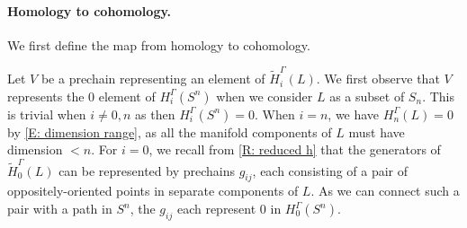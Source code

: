 \documentclass[12pt]{article}
\theoremstyle{plain}
\theoremstyle{definition}
\theoremstyle{remark}
\newcommand{\td}[1]{\tilde{#1}}
\newcommand{\into}{\hookrightarrow}
\newcommand{\Z}{\mathbb{Z}}
\newcommand{\mc}[1]{\mathcal{#1}}
\begin{document}
\begin{comment}
First, let $\mc K_i = \ker(H_i^\Gamma(L) \to H_i^\Gamma(S^n)$, where the map is induced by the inclusion $L \into S^n$.
In all degrees $i>0$, this will simply be $H_i(\Gamma(L))$.
For $0<i<n$, this follows immediately from the computation of the homology of spheres REF.
In dimension $n$, we observe that $H_n^\Gamma(L) = 0$ by \cref{E: dimension range}, as all the manifold components of $L$ must have dimension $<n$.
In degree $0$, if $L$ has $\ell$ components, we have the obvious surjection $H_0^\Gamma(L) \cong \Z^\ell
\to H_0^\Gamma(S^n) \cong \Z$, so the kernel $\mc K_0$ is isomorphic to $\Z^{\ell-1}$.
Generators of $\mc K_0$ can be represented by prechains consisting of pairs of points in separate components of $L$ with opposite orientations, as if they were in the same component then they would represent $0$ in $H_0^\Gamma(L)$.
If $g_{ij}$ is a homology class represented by a prechain with a positive point in component $L_i$ and a negative point in component $L_j$, then we also have the relations $g_{ij}+g_{jk}=g_{ik}$.
So we can take $\mc K_0$ to be the free abelian group on generators $g_{1i}$ of $i>1$ or on generators $g_{i,i+1}$ for $1\leq i\leq \ell-1$.
\end{comment}

\paragraph{Homology to cohomology.} We first define the map from homology to cohomology.

Let $V$ be a prechain representing an element of $\td H_i^\Gamma(L)$.
We first observe that $V$ represents the $0$ element of $H_i^\Gamma(S^n)$ when we consider $L$ as a subset of $S_n$.
This is trivial when $i \neq 0,n$ as then $H_i^\Gamma(S^n)=0$.
When $i = n$, we have $H_n^\Gamma(L) = 0$ by \cref{E: dimension range}, as all the manifold components of $L$ must have dimension $<n$.
For $i=0$, we recall from \cref{R: reduced h} that the generators of $\td H_0^\Gamma(L)$ can be represented by prechains $g_{ij}$, each consisting of a pair of oppositely-oriented points in separate components of $L$.
As we can connect such a pair with a path in $S^n$, the $g_{ij}$ each represent $0$ in $H_0^\Gamma(S^n)$.
\end{document}

